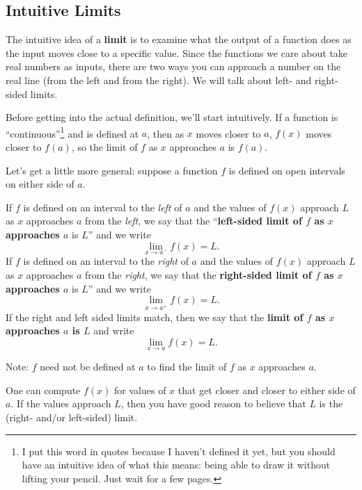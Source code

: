\documentclass{article}
\theoremstyle{definition}
\theoremstyle{definition}
\begin{document}
\subsection{Intuitive Limits}

The intuitive idea of a \textbf{limit} is to examine what the output of a function does as the input moves close to a specific value. Since the functions we care about take real numbers as inputs, there are two ways you can approach a number on the real line (from the left and from the right). We will talk about left- and right-sided limits.

Before getting into the actual definition, we'll start intuitively. If a function is     ``continuous''\footnote{I put this word in quotes because I haven't defined it yet, but you should have an intuitive idea of what this means: being able to draw it without lifting your pencil. Just wait for a few pages.} and is defined at $a$, then as $x$ moves closer to $a$, $f(x)$ moves closer to $f(a)$, so the limit of $f$ as $x$ approaches $a$ is $f(a)$.


Let's get a little more general: suppose a function $f$ is defined on open intervals on either side of $a$.

If $f$ is defined on an interval to the \textit{left} of $a$ and the values of $f(x)$ approach $L$ as $x$ approaches $a$ from the \textit{left}, we say that the ``\textbf{left-sided limit of $f$ as $x$ approaches $a$} is $L$'' and we write $$\lim_{x\to a^-}f(x)=L.$$
If $f$ is defined on an interval to the \textit{right} of $a$ and the values of $f(x)$ approach $L$ as $x$ approaches $a$ from the \textit{right}, we say that the \textbf{right-sided limit of $f$ as $x$ approaches $a$} is $L$'' and we write
$$\lim_{x\to a^+}f(x)=L.$$
If the right and left sided limits match, then we say that the \textbf{limit of $f$ as $x$ approaches $a$ is $L$} and write $$\lim_{x\to a}f(x)=L.$$

\noindent Note: $f$ need not be defined at $a$ to find the limit of $f$ as $x$ approaches $a$.

\vspace{1em}

One can compute $f(x)$ for values of $x$ that get closer and closer to either side of $a$. If the values approach $L$, then you have good reason to believe that $L$ is the (right- and/or left-sided) limit.
\end{document}
